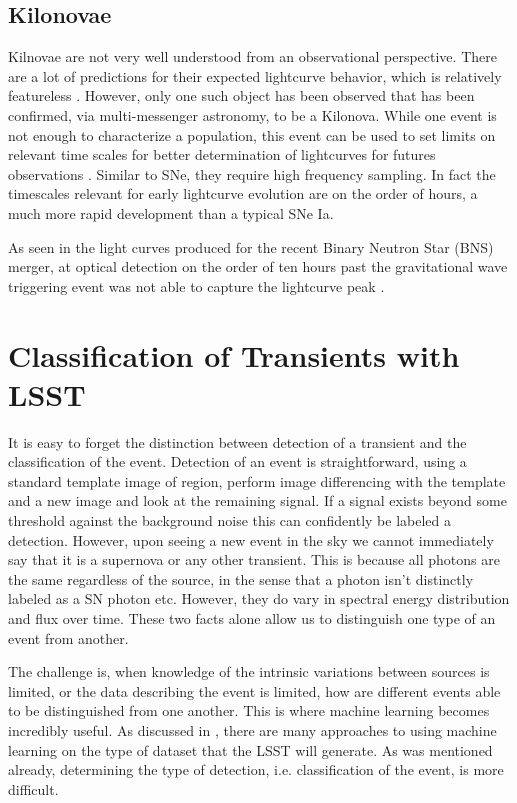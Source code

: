 \documentclass[12pt]{article}
\begin{document}
\subsection{Kilonovae} %
Kilnovae are not very well understood from an observational perspective. There are a lot of predictions for their expected lightcurve behavior, which is relatively featureless \citep{Rosswog2016a}. However, only one such object has been observed that has been confirmed, via multi-messenger astronomy, to be a Kilonova. While one event is not enough to characterize a population, this event can be used to set limits on relevant time scales for better determination of lightcurves for futures observations \citep{Villar2017}. Similar to SNe, they require high frequency sampling. In fact the timescales relevant for early lightcurve evolution are on the order of hours, a much more rapid development than a typical SNe Ia. \par
As seen in the light curves produced for the recent Binary Neutron Star (BNS) merger, at optical detection on the order of ten hours past the gravitational wave triggering event was not able to capture the lightcurve peak \cite{Villar2017}.

\section{Classification of Transients with LSST} %
It is easy to forget the distinction between detection of a transient and the classification of the event. Detection of an event is straightforward, using a standard template image of region, perform image differencing with the template and a new image and look at the remaining signal. If a signal exists beyond some threshold against the background noise this can confidently be labeled a detection. However, upon seeing a new event in the sky we cannot immediately say that it is a supernova or any other transient. This is because all photons are the same regardless of the source, in the sense that a photon isn't distinctly labeled as a SN photon etc. However, they do vary in spectral energy distribution and flux over time. These two facts alone allow us to distinguish one type of an event from another. \par
The challenge is, when knowledge of the intrinsic variations between sources is limited, or the data describing the event is limited, how are different events able to be distinguished from one another. This is where machine learning becomes incredibly useful. As discussed in \cite{Lochner2016}, there are many approaches to using machine learning on the type of dataset that the LSST will generate. As was mentioned already, determining the type of detection, i.e. classification of the event, is more difficult. 
\end{document}
